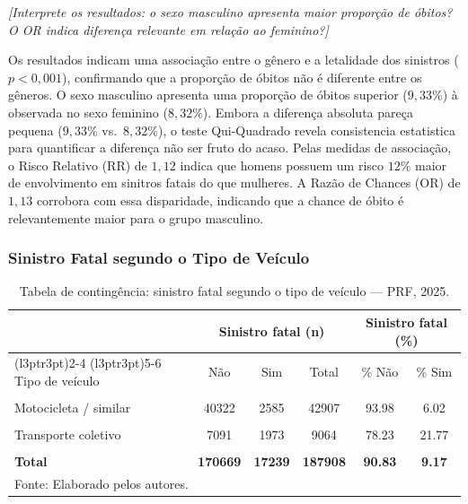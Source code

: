 \documentclass[
  brazilian,
  12pt,
]{article}
\begin{document}
\emph{{[}Interprete os resultados: o sexo masculino apresenta maior
proporção de óbitos? O OR indica diferença relevante em relação ao
feminino?{]}}

Os resultados indicam uma associação entre o gênero e a letalidade dos
sinistros (\(p < 0,001\)), confirmando que a proporção de óbitos não é
diferente entre os gêneros. O sexo masculino apresenta uma proporção de
óbitos superior (\(9,33\%\)) à observada no sexo feminino (\(8,32\%\)).
Embora a diferença absoluta pareça pequena (\(9,33\%\) vs.~\(8,32\%\)),
o teste Qui-Quadrado revela consistencia estatistica para quantificar a
diferença não ser fruto do acaso. Pelas medidas de associação, o Risco
Relativo (RR) de \(1,12\) indica que homens possuem um risco \(12\%\)
maior de envolvimento em sinitros fatais do que mulheres. A Razão de
Chances (OR) de \(1,13\) corrobora com essa disparidade, indicando que a
chance de óbito é relevantemente maior para o grupo masculino.

\subsubsection{Sinistro Fatal segundo o Tipo de
Veículo}\label{sinistro-fatal-segundo-o-tipo-de-veuxedculo}

\begingroup\fontsize{11}{13}\selectfont

\begin{longtable}[t]{lccccc}
\caption{\label{tab:tab13}Tabela de contingência: sinistro fatal segundo o tipo de veículo — PRF, 2025.}\\
\toprule
\multicolumn{1}{c}{ } & \multicolumn{3}{c}{Sinistro fatal (n)} & \multicolumn{2}{c}{Sinistro fatal (\%)} \\
\cmidrule(l{3pt}r{3pt}){2-4} \cmidrule(l{3pt}r{3pt}){5-6}
Tipo de veículo & Não & Sim & Total & \% Não & \% Sim\\
\midrule
\cellcolor{gray!10}{Automóvel / utilitário leve} & \cellcolor{gray!10}{86049} & \cellcolor{gray!10}{6752} & \cellcolor{gray!10}{92801} & \cellcolor{gray!10}{92.72} & \cellcolor{gray!10}{7.28}\\
Motocicleta / similar & 40322 & 2585 & 42907 & 93.98 & 6.02\\
\cellcolor{gray!10}{Não motorizado / especial} & \cellcolor{gray!10}{1641} & \cellcolor{gray!10}{255} & \cellcolor{gray!10}{1896} & \cellcolor{gray!10}{86.55} & \cellcolor{gray!10}{13.45}\\
Transporte coletivo & 7091 & 1973 & 9064 & 78.23 & 21.77\\
\cellcolor{gray!10}{Veículo pesado} & \cellcolor{gray!10}{35566} & \cellcolor{gray!10}{5674} & \cellcolor{gray!10}{41240} & \cellcolor{gray!10}{86.24} & \cellcolor{gray!10}{13.76}\\
\addlinespace
\textbf{Total} & \textbf{170669} & \textbf{17239} & \textbf{187908} & \textbf{90.83} & \textbf{9.17}\\
\bottomrule
\multicolumn{6}{l}{\rule{0pt}{1em}Fonte: Elaborado pelos autores.}\\
\end{longtable}
\endgroup{}
\end{document}
